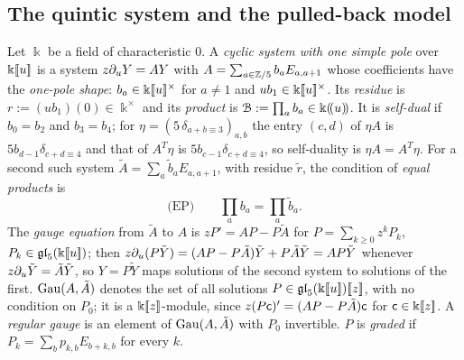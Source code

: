 
\subsection{The quintic system and the pulled-back model}
\label{sec:gau-systems}

\begin{defn}
\label{def:gau-onepole}
Let $\Bbbk$ be a field of characteristic $0$. A \emph{cyclic system with one simple pole} over $\Bbbk[\![ u ]\!]$ is a system $z\partial_uY=AY$ with $A=\sum_{a\in\mathbb{Z}/5}b_aE_{a,a+1}$ whose coefficients have the \emph{one-pole shape}: $b_a\in\Bbbk[\![ u ]\!]^\times$ for $a\neq1$ and $ub_1\in\Bbbk[\![ u ]\!]^\times$. Its \emph{residue} is $r:=(ub_1)(0)\in\Bbbk^\times$ and its \emph{product} is $\mathcal{B}:=\prod_ab_a\in\Bbbk(\!(u)\!)$. It is \emph{self-dual} if $b_0=b_2$ and $b_3=b_4$; for $\eta=(5\,\delta_{a+b\equiv3})_{a,b}$ the entry $(c,d)$ of $\eta A$ is $5b_{d-1}\delta_{c+d\equiv4}$ and that of $A^T\eta$ is $5b_{c-1}\delta_{c+d\equiv4}$, so self-duality is $\eta A=A^T\eta$. For a second such system $\tilde A=\sum_a\tilde b_aE_{a,a+1}$, with residue $\tilde r$, the condition of \emph{equal products} is
\[
\text{(EP)}\qquad \prod_ab_a=\prod_a\tilde b_a .
\]
The \emph{gauge equation} from $\tilde A$ to $A$ is $zP'=AP-P\tilde A$ for $P=\sum_{k\geq0}z^kP_k$, $P_k\in\mathfrak{gl}_5(\Bbbk[\![ u ]\!])$; then $z\partial_u(P\tilde Y)=(AP-P\tilde A)\tilde Y+P\tilde A\tilde Y=AP\tilde Y$ whenever $z\partial_u\tilde Y=\tilde A\tilde Y$, so $Y=P\tilde Y$ maps solutions of the second system to solutions of the first. $\operatorname{Gau}(A,\tilde A)$ denotes the set of all solutions $P\in\mathfrak{gl}_5(\Bbbk[\![ u ]\!])[\![ z ]\!]$, with no condition on $P_0$; it is a $\Bbbk[\![ z ]\!]$-module, since $z(P\mathsf{c})'=(AP-P\tilde A)\mathsf{c}$ for $\mathsf{c}\in\Bbbk[\![ z ]\!]$. A \emph{regular gauge} is an element of $\operatorname{Gau}(A,\tilde A)$ with $P_0$ invertible. $P$ is \emph{graded} if $P_k=\sum_bp_{k,b}E_{b+k,b}$ for every $k$.
\end{defn}

